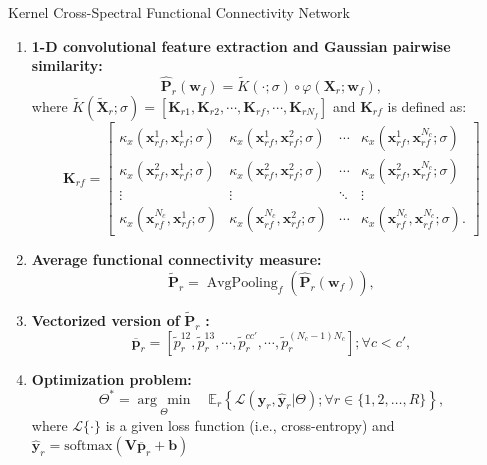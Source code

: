 \documentclass[aspectratio=169]{beamer}
\providecommand{\promeddd}[2]{\mathbb{E}_{#1}\!\left\{#2\right\}}%
\newcommand{\ve}[1]{\bm {#1}}
\newcommand{\mat}[1]{\bm {#1}}
\begin{document}
\begin{frame}[allowframebreaks]{Kernel Cross-Spectral Functional Connectivity Network}
    \begin{enumerate}
        \item \textbf{1-D convolutional feature extraction and Gaussian pairwise similarity:}
        \[
            \hat{\mat{P}}_{r}(\ve{w}_f)  = \tilde{K}(\cdot;\sigma) \circ \varphi(\mat{X}_r; \ve{w}_f), 
        \]
        where $\tilde{K}(\mat{\tilde{X}}_r;\sigma) = \left[ \mat{K}_{r1} , \mat{K}_{r2}, \cdots,\mat{K}_{rf},\cdots, \mat{K}_{rN_f} \right]$ and  $\mat{K}_{rf}$ is defined as:
        \[
            \mat{K}_{rf} = \begin{bmatrix}
                \kappa_{x}(\ve{x}^{1}_{rf}, \ve{x}^{1}_{rf}; \sigma) & \kappa_{x}(\ve{x}^{1}_{rf}, \ve{x}^{2}_{rf}; \sigma) & \cdots & \kappa_{x}(\ve{x}^{1}_{rf}, \ve{x}^{N_c}_{rf}; \sigma) \\
                \kappa_{x}(\ve{x}^{2}_{rf}, \ve{x}^{1}_{rf}; \sigma) & \kappa_{x}(\ve{x}^{2}_{rf}, \ve{x}^{2}_{rf}; \sigma) & \cdots & \kappa_{x}(\ve{x}^{2}_{rf}, \ve{x}^{N_c}_{rf}; \sigma) \\
                \vdots & \vdots & \ddots & \vdots \\
                \kappa_{x}(\ve{x}^{N_c}_{rf}, \ve{x}^{1}_{rf}; \sigma) & \kappa_{x}(\ve{x}^{N_c}_{rf}, \ve{x}^{2}_{rf}; \sigma) & \cdots & \kappa_{x}(\ve{x}^{N_c}_{rf}, \ve{x}^{N_c}_{rf}; \sigma).
            \end{bmatrix}
        \]
        \item \textbf{Average functional connectivity measure:}
        \[
            \tilde{\mat{P}}_r  = \operatorname{AvgPooling}_{f} \left(\hat{\mat{P}}_{r}(\ve{w}_f)\right),
        \]
        \item \textbf{Vectorized version of} $\tilde{\mat{P}}_r$ \textbf{:}
        \[
            \overline{\ve{p}}_r = \left[\tilde{p}_r^{12}, \tilde{p}_r^{13}, \cdots, \tilde{p}_r^{cc'}, \cdots, \tilde{p}_r^{(N_c-1) N_c} \right]; \forall c<c',
        \]
        \item \textbf{Optimization problem:}
        \[
            \Theta^{*} = \underset{\Theta}{\arg\,\min} \quad \promeddd{r}{\mathcal{L}(\ve{y}_r,\hat{\ve{y}}_r|\Theta); \forall r\in\{1,2,\dots,R\}},
        \]
        where $\mathcal{L} \{\cdot\}$ is a given loss function (i.e., cross-entropy) and $\hat{\ve{y}}_r = \mathrm{softmax}\left(\mat{V}\overline{\ve{p}}_r + \ve{b}\right)$
    \end{enumerate}
\end{frame}
\end{document}

